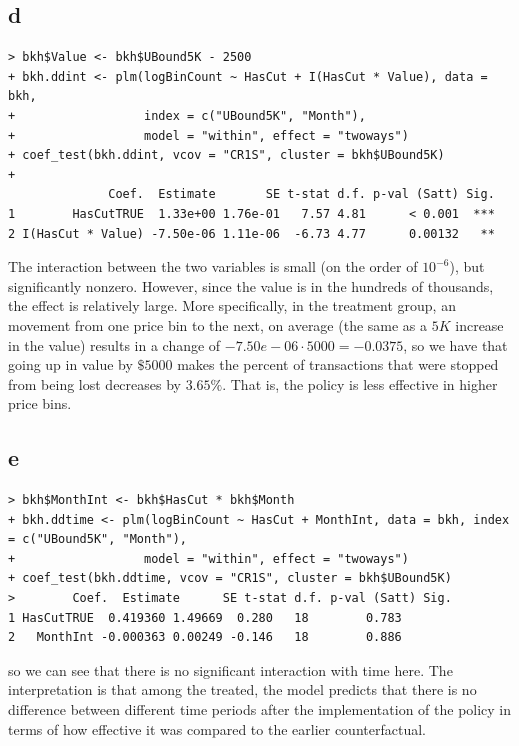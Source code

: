 \documentclass[12pt,letterpaper]{article}
\theoremstyle{definition}
\begin{document}
\subsection*{d}

\begin{Verbatim}[fontsize=\small]
> bkh$Value <- bkh$UBound5K - 2500
+ bkh.ddint <- plm(logBinCount ~ HasCut + I(HasCut * Value), data = bkh,
+                  index = c("UBound5K", "Month"),
+                  model = "within", effect = "twoways")
+ coef_test(bkh.ddint, vcov = "CR1S", cluster = bkh$UBound5K)
+
              Coef.  Estimate       SE t-stat d.f. p-val (Satt) Sig.
1        HasCutTRUE  1.33e+00 1.76e-01   7.57 4.81      < 0.001  ***
2 I(HasCut * Value) -7.50e-06 1.11e-06  -6.73 4.77      0.00132   **
\end{Verbatim}

The interaction between the two variables is small (on the order of $10^{-6}$), but significantly nonzero. However, since the value is in the hundreds of thousands, the effect is relatively large. More specifically, in the treatment group, an movement from one price bin to the next, on average (the same as a $5K$ increase in the value) results in a change of $-7.50e-06 \cdot 5000 = -0.0375$, so we have that going up in value by $\$5000$ makes the percent of transactions that were stopped from being lost decreases by $3.65\%$. That is, the policy is less effective in higher price bins.

\subsection*{e}

\begin{Verbatim}[fontsize=\small]
> bkh$MonthInt <- bkh$HasCut * bkh$Month
+ bkh.ddtime <- plm(logBinCount ~ HasCut + MonthInt, data = bkh, index = c("UBound5K", "Month"),
+                  model = "within", effect = "twoways")
+ coef_test(bkh.ddtime, vcov = "CR1S", cluster = bkh$UBound5K)
>        Coef.  Estimate      SE t-stat d.f. p-val (Satt) Sig.
1 HasCutTRUE  0.419360 1.49669  0.280   18        0.783
2   MonthInt -0.000363 0.00249 -0.146   18        0.886
\end{Verbatim}
so we can see that there is no significant interaction with time here. The interpretation is that among the treated, the model predicts that there is no difference between different time periods after the implementation of the policy in terms of how effective it was compared to the earlier counterfactual.
\end{document}
